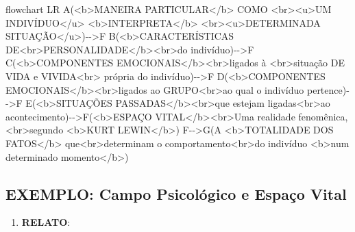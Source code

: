 \documentclass[
]{book}
\newenvironment{Shaded}{\begin{snugshade}}{\end{snugshade}}
\newcommand{\NormalTok}[1]{#1}
\providecommand{\tightlist}{%
  \setlength{\itemsep}{0pt}\setlength{\parskip}{0pt}}
\begin{document}
\begin{Shaded}
\begin{Highlighting}[]
\NormalTok{flowchart LR}
\NormalTok{A(\textless{}b\textgreater{}MANEIRA PARTICULAR\textless{}/b\textgreater{} COMO \textless{}br\textgreater{}\textless{}u\textgreater{}UM INDIVÍDUO\textless{}/u\textgreater{} \textless{}b\textgreater{}INTERPRETA\textless{}/b\textgreater{} \textless{}br\textgreater{}\textless{}u\textgreater{}DETERMINADA SITUAÇÃO\textless{}/u\textgreater{}){-}{-}\textgreater{}F}
\NormalTok{B(\textless{}b\textgreater{}CARACTERÍSTICAS DE\textless{}br\textgreater{}PERSONALIDADE\textless{}/b\textgreater{}\textless{}br\textgreater{}do indivíduo){-}{-}\textgreater{}F}
\NormalTok{C(\textless{}b\textgreater{}COMPONENTES EMOCIONAIS\textless{}/b\textgreater{}\textless{}br\textgreater{}ligados à \textless{}br\textgreater{}situação DE VIDA e VIVIDA\textless{}br\textgreater{} própria do indivíduo){-}{-}\textgreater{}F}
\NormalTok{D(\textless{}b\textgreater{}COMPONENTES EMOCIONAIS\textless{}/b\textgreater{}\textless{}br\textgreater{}ligados ao GRUPO\textless{}br\textgreater{}ao qual o indivíduo pertence){-}{-}\textgreater{}F}
\NormalTok{E(\textless{}b\textgreater{}SITUAÇÕES PASSADAS\textless{}/b\textgreater{}\textless{}br\textgreater{}que estejam ligadas\textless{}br\textgreater{}ao acontecimento){-}{-}\textgreater{}F(\textless{}b\textgreater{}ESPAÇO VITAL\textless{}/b\textgreater{}\textless{}br\textgreater{}\textquotesingle{}\textquotesingle{}Uma realidade fenomênica\textquotesingle{}\textquotesingle{},\textless{}br\textgreater{}segundo \textless{}b\textgreater{}KURT LEWIN\textless{}/b\textgreater{})}
\NormalTok{F{-}{-}\textgreater{}G(A \textless{}b\textgreater{}TOTALIDADE DOS FATOS\textless{}/b\textgreater{} que\textless{}br\textgreater{}determinam o comportamento\textless{}br\textgreater{}do indivíduo \textless{}b\textgreater{}num determinado momento\textless{}/b\textgreater{})}
\end{Highlighting}
\end{Shaded}

\hypertarget{exemplo-campo-psicoluxf3gico-e-espauxe7o-vital}{%
\subsection{EXEMPLO: Campo Psicológico e Espaço Vital}\label{exemplo-campo-psicoluxf3gico-e-espauxe7o-vital}}

\begin{enumerate}
\def\labelenumi{\arabic{enumi}.}
\tightlist
\item
  \textbf{RELATO}:
\end{enumerate}
\end{document}
